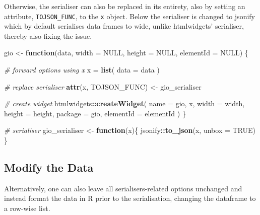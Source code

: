 \documentclass[
]{krantz}
\makeatletter
\newenvironment{Shaded}{\begin{snugshade}}{\end{snugshade}}
\newcommand{\CommentTok}[1]{\textcolor[rgb]{0.37,0.37,0.37}{\textit{#1}}}
\newcommand{\ControlFlowTok}[1]{\textcolor[rgb]{0.27,0.27,0.27}{\textbf{#1}}}
\newcommand{\DataTypeTok}[1]{\textcolor[rgb]{0.27,0.27,0.27}{#1}}
\newcommand{\KeywordTok}[1]{\textcolor[rgb]{0.27,0.27,0.27}{\textbf{#1}}}
\newcommand{\NormalTok}[1]{#1}
\newcommand{\OperatorTok}[1]{\textcolor[rgb]{0.43,0.43,0.43}{\textbf{#1}}}
\newcommand{\OtherTok}[1]{\textcolor[rgb]{0.37,0.37,0.37}{#1}}
\newcommand{\StringTok}[1]{\textcolor[rgb]{0.5,0.5,0.5}{#1}}
\newenvironment{kframe}{%
\medskip{}
\setlength{\fboxsep}{.8em}
 \def\at@end@of@kframe{}%
 \ifinner\ifhmode%
  \def\at@end@of@kframe{\end{minipage}}%
  \begin{minipage}{\columnwidth}%
 \fi\fi%
 \def\FrameCommand##1{\hskip\@totalleftmargin \hskip-\fboxsep
 \colorbox{shadecolor}{##1}\hskip-\fboxsep
     \hskip-\linewidth \hskip-\@totalleftmargin \hskip\columnwidth}%
 \MakeFramed {\advance\hsize-\width
   \@totalleftmargin\z@ \linewidth\hsize
   \@setminipage}}%
 {\par\unskip\endMakeFramed%
 \at@end@of@kframe}
\renewenvironment{Shaded}{\begin{kframe}}{\end{kframe}}
\makeatother
\begin{document}
Otherwise, the serialiser can also be replaced in its entirety, also by setting an attribute, \texttt{TOJSON\_FUNC}, to the \texttt{x} object. Below the serialiser is changed to jsonify \citep{R-jsonify} which by default serialises data frames to wide, unlike htmlwidgets' serialiser, thereby also fixing the issue.

\begin{Shaded}
\begin{Highlighting}[]
\NormalTok{gio <{-}}\StringTok{ }\ControlFlowTok{function}\NormalTok{(data, }\DataTypeTok{width =} \OtherTok{NULL}\NormalTok{, }\DataTypeTok{height =} \OtherTok{NULL}\NormalTok{, }
  \DataTypeTok{elementId =} \OtherTok{NULL}\NormalTok{) \{}

  \CommentTok{\# forward options using x}
\NormalTok{  x =}\StringTok{ }\KeywordTok{list}\NormalTok{(}
    \DataTypeTok{data =}\NormalTok{ data}
\NormalTok{  )}

  \CommentTok{\# replace serialiser}
  \KeywordTok{attr}\NormalTok{(x, }\StringTok{\textquotesingle{}TOJSON\_FUNC\textquotesingle{}}\NormalTok{) <{-}}\StringTok{ }\NormalTok{gio\_serialiser}

  \CommentTok{\# create widget}
\NormalTok{  htmlwidgets}\OperatorTok{::}\KeywordTok{createWidget}\NormalTok{(}
    \DataTypeTok{name =} \StringTok{\textquotesingle{}gio\textquotesingle{}}\NormalTok{,}
\NormalTok{    x,}
    \DataTypeTok{width =}\NormalTok{ width,}
    \DataTypeTok{height =}\NormalTok{ height,}
    \DataTypeTok{package =} \StringTok{\textquotesingle{}gio\textquotesingle{}}\NormalTok{,}
    \DataTypeTok{elementId =}\NormalTok{ elementId}
\NormalTok{  )}
\NormalTok{\}}

\CommentTok{\# serialiser}
\NormalTok{gio\_serialiser <{-}}\StringTok{ }\ControlFlowTok{function}\NormalTok{(x)\{}
\NormalTok{  jsonify}\OperatorTok{::}\KeywordTok{to\_json}\NormalTok{(x, }\DataTypeTok{unbox =} \OtherTok{TRUE}\NormalTok{)}
\NormalTok{\}}
\end{Highlighting}
\end{Shaded}

\hypertarget{widgets-full-transform-data-modify-data}{%
\subsection{Modify the Data}\label{widgets-full-transform-data-modify-data}}

Alternatively, one can also leave all serialisers-related options unchanged and instead format the data in R prior to the serialisation, changing the dataframe to a row-wise list.
\end{document}
